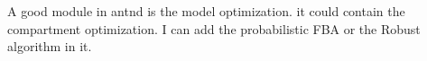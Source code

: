 A good module in antnd is the model optimization. it could contain the compartment optimization.
I can add the probabilistic FBA or the Robust algorithm in it. 